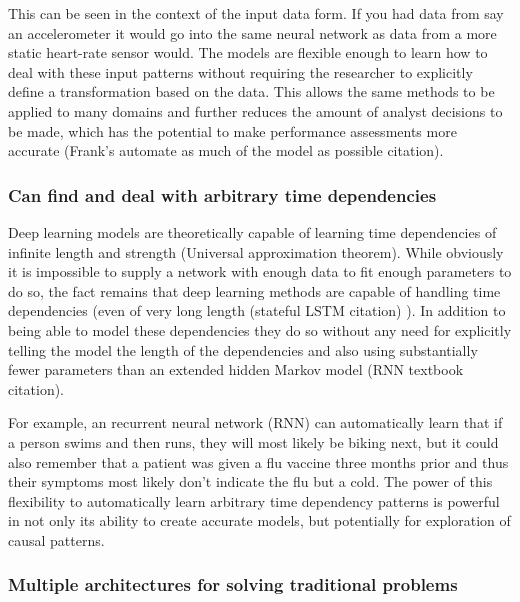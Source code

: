 \documentclass[]{book}
\theoremstyle{definition}
\theoremstyle{definition}
\theoremstyle{definition}
\theoremstyle{remark}
\begin{document}
This can be seen in the context of the input data form. If you had data
from say an accelerometer it would go into the same neural network as
data from a more static heart-rate sensor would. The models are flexible
enough to learn how to deal with these input patterns without requiring
the researcher to explicitly define a transformation based on the data.
This allows the same methods to be applied to many domains and further
reduces the amount of analyst decisions to be made, which has the
potential to make performance assessments more accurate (Frank's
automate as much of the model as possible citation).

\subsubsection{Can find and deal with arbitrary time
dependencies}\label{can-find-and-deal-with-arbitrary-time-dependencies}

Deep learning models are theoretically capable of learning time
dependencies of infinite length and strength (Universal approximation
theorem). While obviously it is impossible to supply a network with
enough data to fit enough parameters to do so, the fact remains that
deep learning methods are capable of handling time dependencies (even of
very long length (stateful LSTM citation) ). In addition to being able
to model these dependencies they do so without any need for explicitly
telling the model the length of the dependencies and also using
substantially fewer parameters than an extended hidden Markov model (RNN
textbook citation).

For example, an recurrent neural network (RNN) can automatically learn
that if a person swims and then runs, they will most likely be biking
next, but it could also remember that a patient was given a flu vaccine
three months prior and thus their symptoms most likely don't indicate
the flu but a cold. The power of this flexibility to automatically learn
arbitrary time dependency patterns is powerful in not only its ability
to create accurate models, but potentially for exploration of causal
patterns.

\subsubsection{Multiple architectures for solving traditional
problems}\label{multiple-architectures-for-solving-traditional-problems}
\end{document}
